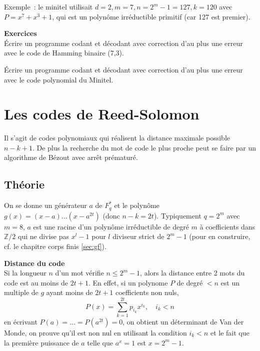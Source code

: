 \documentclass[a4paper,11pt]{book}
\begin{document}
\begin{giacjshere}
Exemple~: le minitel utilisait $d=2, m=7, n=2^m-1=127, k=120$
avec $P=x^7+x^3+1$, qui est un polyn\^ome irr\'eductible primitif
(car 127 est premier).

{\bf Exercices}\\
\'Ecrire un programme codant et d\'ecodant avec correction d'au plus une
erreur avec le code de Hamming binaire (7,3).

\'Ecrire un programme codant et d\'ecodant avec correction d'au plus une
erreur avec le code polynomial du Minitel.

\vfill

\pagebreak

\section{Les codes de Reed-Solomon}
Il s'agit de codes polynomiaux qui r\'ealisent la distance maximale
possible $n-k+1$. De plus la recherche du mot de code le plus
proche peut se faire par un algorithme de B\'ezout avec arr\^et 
pr\'ematur\'e.

\subsection{Théorie}
On se donne un g\'en\'erateur $a$ 
de $F_q^*$ et le polyn\^ome $g(x)=(x-a)...(x-a^{2t})$ (donc $n-k=2t$). 
Typiquement $q=2^m$ avec $m=8$, 
$a$ est une racine d'un polyn\^ome irr\'eductible
de degr\'e $m$ à coefficients dans $\mathbb{Z}/2$ 
qui ne divise pas $x^l-1$ pour $l$ diviseur
strict de $2^m-1$ (pour en construire,
cf. le chapitre corps finis \ref{sec:gf}).

{\bf Distance du code}\\
Si la longueur $n$ d'un mot v\'erifie
$n \leq 2^m-1$, alors la distance entre 2 mots du code est au moins
de $2t+1$.
En effet, si un polynome $P$ de degr\'e $<n$ est un multiple de $g$
ayant moins de $2t+1$ coefficients non nuls,
\[ P(x)=\sum_{k=1}^{2t} p_{i_k} x^{i_k}, \quad i_k<n \]
en \'ecrivant $P(a)=...=P(a^{2t})=0$, on obtient
un d\'eterminant de Van der Monde, on prouve qu'il est non nul en
utilisant la condition $i_k<n$ et le fait que la premi\`ere puissance
de $a$ telle que $a^x=1$ est $x=2^m-1$.



\end{giacjshere}
\end{document}
